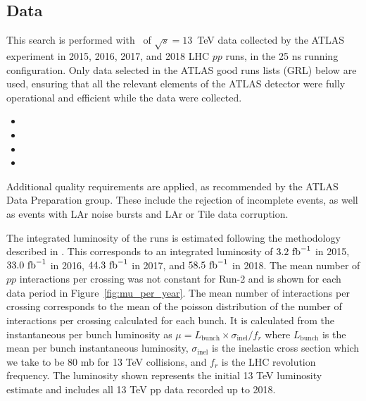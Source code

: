 \subsection{Data}
\label{subsec:data}
This search is performed with \lumi\ of $\sqrt{s} = 13$~TeV data collected by the ATLAS experiment in 2015, 2016, 2017, and 2018 LHC $pp$ runs, in the 25 ns running configuration.
Only data selected in the ATLAS good runs lists (GRL) below are used, ensuring that all the relevant elements of the ATLAS detector were fully operational and efficient while the data were collected.
\begin{itemize}
    \tiny
    \itemsep -1em 
    \item {}
    \item {}
    \item {}
    \item {}
    \normalsize
\end{itemize}
Additional quality requirements are applied, as recommended by the ATLAS Data Preparation group. These include the rejection of incomplete events, as well as events with LAr noise bursts and LAr or Tile data corruption.

The integrated luminosity of the runs is estimated following the methodology described in \cite{Aad:2013ucp}.
This corresponds to an integrated luminosity of $3.2~\text{fb}^{-1}$ in 2015, $33.0~\text{fb}^{-1}$ in 2016, $44.3~\text{fb}^{-1}$ in 2017, and $58.5~\text{fb}^{-1}$ in 2018.
The mean number of $pp$ interactions per crossing was not constant for Run-2 and is shown for each data period in Figure~\ref{fig:mu_per_year}.
The mean number of interactions per crossing corresponds to the mean of the poisson distribution of the number of interactions per crossing calculated for each bunch.
It is calculated from the instantaneous per bunch luminosity as $\mu = L_{\mathrm{bunch}} × \sigma_{\mathrm{inel}} / f_r$ where $L_{\mathrm{bunch}}$ is the mean per bunch instantaneous luminosity, $\sigma_{\mathrm{inel}}$ is the inelastic cross section which we take to be 80 mb for 13 TeV collisions, and $f_r$ is the LHC revolution frequency.
The luminosity shown represents the initial 13 TeV luminosity estimate and includes all 13 TeV pp data recorded up to 2018.

